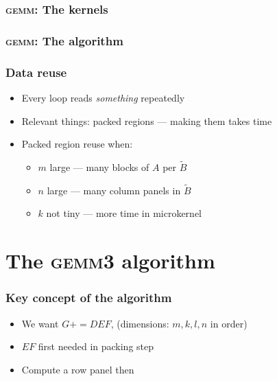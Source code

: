 \documentclass{beamer}
\newcommand*{\pluseq}{\mathrel{{+}{=}}}
\newcommand*{\gemmt}{{\textsc{gemm3}}}
\newcommand*{\gemm}{{\textsc{gemm}}}
\begin{document}
\begin{frame}
  \frametitle{\gemm{}: The kernels}
  \begin{adjustbox}{max size={!}{0.87\textheight},center}
  \end{adjustbox}
\end{frame}

\begin{frame}
  \frametitle{\gemm{}: The algorithm}
  \begin{adjustbox}{max size={!}{0.87\textheight},center}
  \begin{tikzpicture}
    
  \end{tikzpicture}
  \end{adjustbox}
\end{frame}


\begin{frame}
  \frametitle{Data reuse}
  \begin{itemize}
  \item Every loop reads \emph{something} repeatedly
  \item Relevant things: packed regions --- making them takes time
  \item Packed region reuse when:
    \begin{itemize}
    \item $m$ large --- many blocks of $A$ per $\widetilde{B}$
    \item $n$ large --- many column panels in $\widetilde{B}$
    \item $k$ not tiny --- more time in microkernel
    \end{itemize}
  \end{itemize}
\end{frame}

\section[\gemmt{}]{The \gemmt{} algorithm}
\frame{\sectionpage}

\begin{frame}
  \frametitle{Key concept of the algorithm}
  \begin{itemize}
  \item We want $G \pluseq DEF$, (dimensions: $m, k, l, n$ in order)
  \item $EF$ first needed in packing step
  \item Compute a row panel then
  \end{itemize}
\end{frame}
\end{document}
